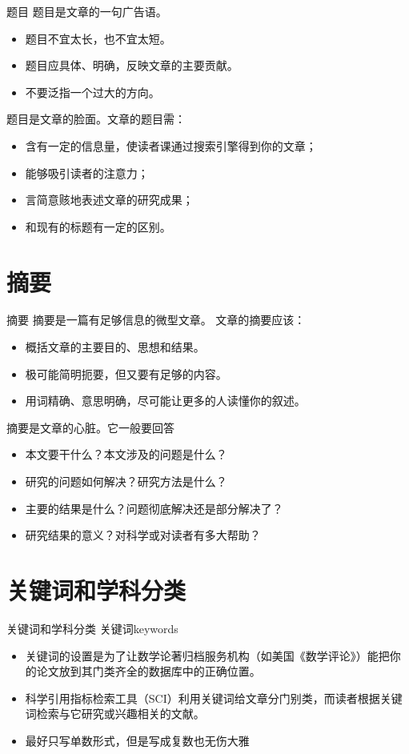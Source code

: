 \documentclass[13pt]{ctexbeamer}
\begin{document}
\begin{frame}{题目}
	题目是文章的一句广告语。
	\begin{itemize}
		\item 题目不宜太长，也不宜太短。
		\item 题目应具体、明确，反映文章的主要贡献。
		\item 不要泛指一个过大的方向。
	\end{itemize}

题目是文章的脸面。文章的题目需：
\begin{itemize}
	\item 含有一定的信息量，使读者课通过搜索引擎得到你的文章；
	\item 能够吸引读者的注意力；
	\item  言简意赅地表述文章的研究成果；
	\item 和现有的标题有一定的区别。
\end{itemize}
\end{frame}

\section{摘要}
\begin{frame}{摘要}
摘要是一篇有足够信息的微型文章。	文章的摘要应该：
	\begin{itemize}
		\item 概括文章的主要目的、思想和结果。
		\item 极可能简明扼要，但又要有足够的内容。
		\item 用词精确、意思明确，尽可能让更多的人读懂你的叙述。
	\end{itemize}
	
摘要是文章的心脏。它一般要回答
	\begin{itemize}
		\item 本文要干什么？本文涉及的问题是什么？
		\item 研究的问题如何解决？研究方法是什么？
		\item 主要的结果是什么？问题彻底解决还是部分解决了？
		\item 研究结果的意义？对科学或对读者有多大帮助？
	\end{itemize}

\end{frame}

\section{关键词和学科分类}
\begin{frame}{关键词和学科分类}
	关键词keywords
	\begin{itemize}
		
		\item 关键词的设置是为了让数学论著归档服务机构（如美国《数学评论》）能把你的论文放到其门类齐全的数据库中的正确位置。
		
		\item 科学引用指标检索工具（SCI）利用关键词给文章分门别类，而读者根据关键词检索与它研究或兴趣相关的文献。
		\item 最好只写单数形式，但是写成复数也无伤大雅
	\end{itemize}
\end{frame}
\end{document}
